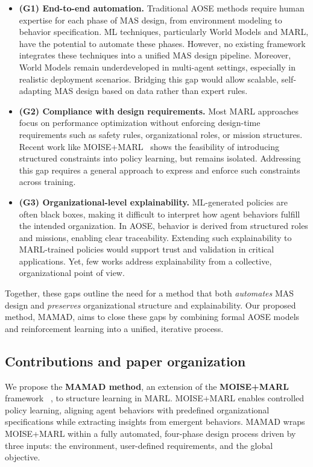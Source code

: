 \documentclass[pdflatex,sn-mathphys-num]{sn-jnl}%
\theoremstyle{thmstyleone}%
\theoremstyle{thmstyletwo}%
\theoremstyle{thmstylethree}%
\begin{document}
\begin{itemize}
    \item \textbf{(G1) End-to-end automation.} Traditional AOSE methods require human expertise for each phase of MAS design, from environment modeling to behavior specification. ML techniques, particularly World Models and MARL, have the potential to automate these phases. However, no existing framework integrates these techniques into a unified MAS design pipeline. Moreover, World Models remain underdeveloped in multi-agent settings, especially in realistic deployment scenarios. Bridging this gap would allow scalable, self-adapting MAS design based on data rather than expert rules.
    \item \textbf{(G2) Compliance with design requirements.} Most MARL approaches focus on performance optimization without enforcing design-time requirements such as safety rules, organizational roles, or mission structures. Recent work like MOISE+MARL~\cite{soule2025moisemarl} shows the feasibility of introducing structured constraints into policy learning, but remains isolated. Addressing this gap requires a general approach to express and enforce such constraints across training.

    \item \textbf{(G3) Organizational-level explainability.} ML-generated policies are often black boxes, making it difficult to interpret how agent behaviors fulfill the intended organization. In AOSE, behavior is derived from structured roles and missions, enabling clear traceability. Extending such explainability to MARL-trained policies would support trust and validation in critical applications. Yet, few works address explainability from a collective, organizational point of view.
\end{itemize}

Together, these gaps outline the need for a method that both \textit{automates} MAS design and \textit{preserves} organizational structure and explainability. Our proposed method, MAMAD, aims to close these gaps by combining formal AOSE models and reinforcement learning into a unified, iterative process.

\subsection{Contributions and paper organization}

We propose the \textbf{MAMAD method}, an extension of the \textbf{MOISE+MARL} framework~\cite{soule2025moisemarl}
, to structure learning in MARL. MOISE+MARL enables controlled policy learning, aligning agent behaviors with predefined organizational specifications while extracting insights from emergent behaviors. MAMAD wraps MOISE+MARL within a fully automated, four-phase design process driven by three inputs: the environment, user-defined requirements, and the global objective.
\end{document}
